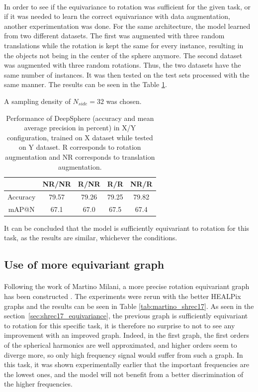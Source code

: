 \documentclass[11pt]{report}
\begin{document}
\paragraph*{}
In order to see if the equivariance to rotation was sufficient for the given task, or if it was needed to learn the correct equivariance with data augmentation, another experimentation was done. For the same architecture, the model learned from two different datasets. The first was augmented with three random translations while the rotation is kept the same for every instance, resulting in the objects not being in the center of the sphere anymore. The second dataset was augmented with three random rotations. Thus, the two datasets have the same number of instances.
It was then tested on the test sets processed with the same manner. The results can be seen in the Table \ref{tab:shrec17_rotequiv}.

A sampling density of $N_{side}=32$ was chosen.
\begin{table}[!ht]
    \centering
    \begin{tabular}{c|c|c|c|c}
         & NR/NR & R/NR & R/R & NR/R  \\ \hline
Accuracy & 79.57 & 79.26 & 79.25 & 79.82 \\\hline
mAP@N    & 67.1 & 67.0 & 67.5 & 67.4
    \end{tabular}
    \caption{Performance of DeepSphere (accuracy and mean average precision in percent) in X/Y configuration, trained on X dataset while tested on Y dataset. R corresponds to rotation augmentation and NR corresponds to translation augmentation.}
    \label{tab:shrec17_rotequiv}
\end{table}
It can be concluded that the model is sufficiently equivariant to rotation for this task, as the results are similar, whichever the conditions.

\subsection{Use of more equivariant graph}
\paragraph*{}
Following the work of Martino Milani, a more precise rotation equivariant graph has been constructed \cite{milani_about_nodate}. The experiments were rerun with the better HEALPix graphs and the results can be seen in Table \ref{tab:martino_shrec17}. As seen in the section~\ref{sec:shrec17_equivariance}, the previous graph is sufficiently equivariant to rotation for this specific task, it is therefore no surprise to not to see any improvement with an improved graph. Indeed, in the first graph, the first orders of the spherical harmonics are well approximated, and higher orders seem to diverge more, so only high frequency signal would suffer from such a graph. In this task, it was shown experimentally earlier that the important frequencies are the lowest ones, and the model will not benefit from a better discrimination of the higher frequencies. 
\end{document}
